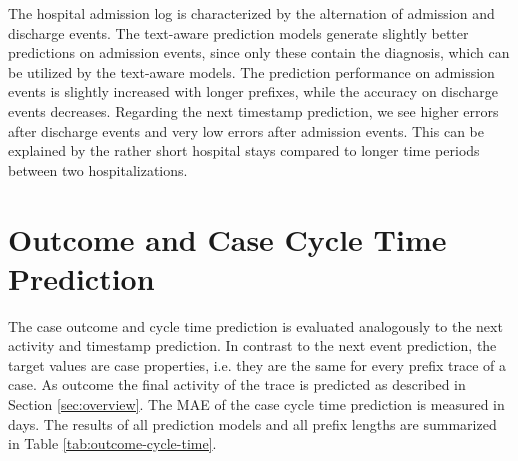 The hospital admission log is characterized by the alternation of admission and discharge events.
The text-aware prediction models generate slightly better predictions on admission events, since only these contain the diagnosis, which can be utilized by the text-aware models.
The prediction performance on admission events is slightly increased with longer prefixes, while the accuracy on discharge events decreases.
Regarding the next timestamp prediction, we see higher errors after discharge events and very low errors after admission events.
This can be explained by the rather short hospital stays compared to longer time periods between two hospitalizations.


\section{Outcome and Case Cycle Time Prediction}



The case outcome and cycle time prediction is evaluated analogously to the next activity and timestamp prediction.
In contrast to the next event prediction, the target values are case properties, i.e. they are the same for every prefix trace of a case.
As outcome the final activity of the trace is predicted as described in Section \ref{sec:overview}.
The MAE of the case cycle time prediction is measured in days.
The results of all prediction models and all prefix lengths are summarized in Table \ref{tab:outcome-cycle-time}.

